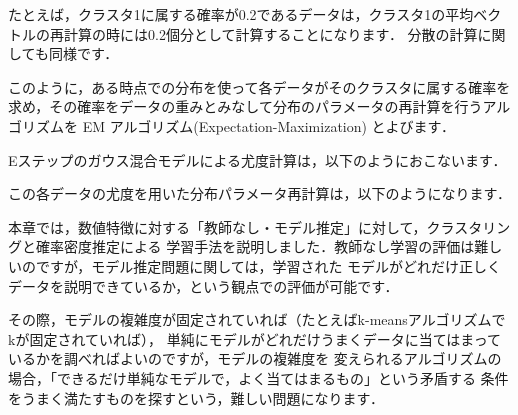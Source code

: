 たとえば，クラスタ1に属する確率が0.2であるデータは，クラスタ1の平均ベクトルの再計算の時には0.2個分として計算することになります．
分散の計算に関しても同様です．


このように，ある時点での分布を使って各データがそのクラスタに属する確率を求め，その確率をデータの重みとみなして分布のパラメータの再計算を行うアルゴリズムを
EM アルゴリズム(Expectation-Maximization)
とよびます．


Eステップのガウス混合モデルによる尤度計算は，以下のようにおこないます．

この各データの尤度を用いた分布パラメータ再計算は，以下のようになります．


本章では，数値特徴に対する「教師なし・モデル推定」に対して，クラスタリングと確率密度推定による
学習手法を説明しました．教師なし学習の評価は難しいのですが，モデル推定問題に関しては，学習された
モデルがどれだけ正しくデータを説明できているか，という観点での評価が可能です．

その際，モデルの複雑度が固定されていれば（たとえばk-meansアルゴリズムでkが固定されていれば），
単純にモデルがどれだけうまくデータに当てはまっているかを調べればよいのですが，モデルの複雑度を
変えられるアルゴリズムの場合，「できるだけ単純なモデルで，よく当てはまるもの」という矛盾する
条件をうまく満たすものを探すという，難しい問題になります．
